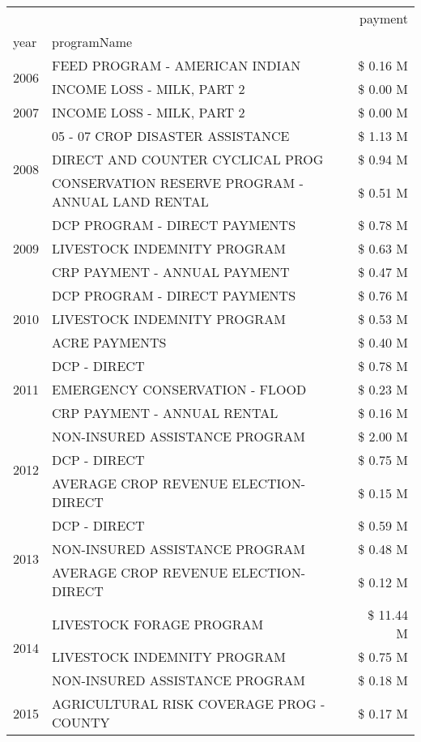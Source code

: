\begin{tabular}{llr}
\toprule
 &  & payment \\
year & programName &  \\
\midrule
\multirow[t]{2}{*}{2006} & FEED PROGRAM - AMERICAN INDIAN & \$ 0.16 M \\
 & INCOME LOSS - MILK, PART 2 & \$ 0.00 M \\
\cline{1-3}
2007 & INCOME LOSS - MILK, PART 2 & \$ 0.00 M \\
\cline{1-3}
\multirow[t]{3}{*}{2008} & 05 - 07 CROP DISASTER ASSISTANCE & \$ 1.13 M \\
 & DIRECT AND COUNTER CYCLICAL PROG & \$ 0.94 M \\
 & CONSERVATION RESERVE PROGRAM - ANNUAL LAND RENTAL & \$ 0.51 M \\
\cline{1-3}
\multirow[t]{3}{*}{2009} & DCP PROGRAM - DIRECT PAYMENTS & \$ 0.78 M \\
 & LIVESTOCK INDEMNITY PROGRAM & \$ 0.63 M \\
 & CRP PAYMENT - ANNUAL PAYMENT & \$ 0.47 M \\
\cline{1-3}
\multirow[t]{3}{*}{2010} & DCP PROGRAM - DIRECT PAYMENTS & \$ 0.76 M \\
 & LIVESTOCK INDEMNITY PROGRAM & \$ 0.53 M \\
 & ACRE PAYMENTS & \$ 0.40 M \\
\cline{1-3}
\multirow[t]{3}{*}{2011} & DCP - DIRECT & \$ 0.78 M \\
 & EMERGENCY CONSERVATION - FLOOD & \$ 0.23 M \\
 & CRP PAYMENT - ANNUAL RENTAL & \$ 0.16 M \\
\cline{1-3}
\multirow[t]{3}{*}{2012} & NON-INSURED ASSISTANCE PROGRAM & \$ 2.00 M \\
 & DCP - DIRECT & \$ 0.75 M \\
 & AVERAGE CROP REVENUE ELECTION-DIRECT & \$ 0.15 M \\
\cline{1-3}
\multirow[t]{3}{*}{2013} & DCP - DIRECT & \$ 0.59 M \\
 & NON-INSURED ASSISTANCE PROGRAM & \$ 0.48 M \\
 & AVERAGE CROP REVENUE ELECTION-DIRECT & \$ 0.12 M \\
\cline{1-3}
\multirow[t]{3}{*}{2014} & LIVESTOCK FORAGE PROGRAM & \$ 11.44 M \\
 & LIVESTOCK INDEMNITY PROGRAM & \$ 0.75 M \\
 & NON-INSURED ASSISTANCE PROGRAM & \$ 0.18 M \\
\cline{1-3}
\multirow[t]{3}{*}{2015} & AGRICULTURAL RISK COVERAGE PROG - COUNTY & \$ 0.17 M \\

\end{tabular}
